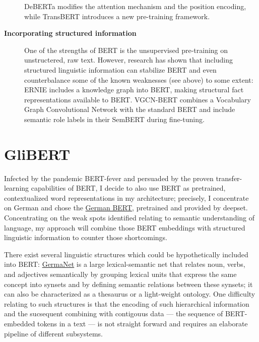 \begin{description}
  DeBERTa \cite{he2020deberta} modifies the attention mechanism and the position encoding, while TransBERT \cite{li2021transbert} introduces a new pre-training framework.
  \item[\textbf{Incorporating structured information}] One of the strengths of BERT is the unsupervised pre-training on unstructered, raw text. However, research has shown that including structured linguistic information can stabilize BERT and even counterbalance some of the known weaknesses (see above) to some extent:
  ERNIE \cite{sun2019ernie} includes a knowledge graph into BERT, making structural fact representations available to BERT.
  VGCN-BERT \cite{lu2020vgcn} combines a Vocabulary Graph Convolutional Network with the standard BERT and \cite{zhang2019semantics} include semantic role labels in their SemBERT during fine-tuning.
\end{description}


\section{GliBERT}

Infected by the pandemic BERT-fever and persuaded by the proven transfer-learning
capabilities of BERT, I decide to also use BERT as pretrained, contextualized word
representations in my architecture; precisely, I concentrate on German and chose
the \href{https://deepset.ai/german-bert}{German BERT}, pretrained and provided
by deepset. Concentrating on the weak spots identified relating to semantic
understanding of language, my approach will combine those BERT embeddings with
structured linguistic information to counter those shortcomings.

There exist several linguistic structures which could be hypothetically included into BERT:
\href{https://uni-tuebingen.de/en/faculties/faculty-of-humanities/departments/modern-languages/department-of-linguistics/chairs/general-and-computational-linguistics/ressources/lexica/germanet/}{GermaNet}
\citep{hamp1997germanet} is a large lexical-semantic net that relates noun, verbs, and
adjectives semantically by grouping lexical units that express the same concept into synsets
and by defining semantic relations between these synsets; it can also be characterized as a
thesaurus or a light-weight ontology. One difficulty relating to such structures is
that the encoding of such hierarchical information and the sucsequent combining with
contigouus data --- the sequence of BERT-embedded tokens in a text --- is not straight forward
and requires an elaborate pipeline of different subsystems.

